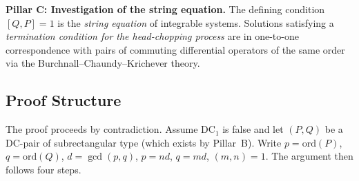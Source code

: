 \documentclass[12pt,a4paper]{article}
\theoremstyle{definition}
\begin{document}
\medskip\noindent
\textbf{Pillar C: Investigation of the string equation.}  The defining
condition $[Q, P] = 1$ is the \emph{string equation} of integrable
systems.  Solutions satisfying a \emph{termination condition for the
head-chopping process} are in one-to-one correspondence with pairs of
commuting differential operators of the same order via the
Burchnall--Chaundy--Krichever theory.

\subsection{Proof Structure}

The proof proceeds by contradiction.  Assume DC$_1$ is false and let
$(P, Q)$ be a DC-pair of subrectangular type (which exists by
Pillar~B).  Write $p = \mathrm{ord}(P)$, $q = \mathrm{ord}(Q)$,
$d = \gcd(p,q)$, $p = nd$, $q = md$, $(m,n) = 1$.
The argument then follows four steps.
\end{document}

